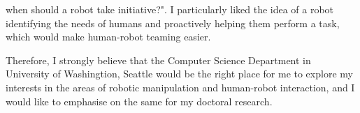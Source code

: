 \documentclass[11pt]{article}
\newcommand{\statement}[1]{\par\medskip
  \textcolor{blue}{\textbf{#1:}}\space
}
\begin{document}
when should a robot take initiative?". I particularly liked the idea of a robot identifying the needs of humans and proactively helping them perform a task, which would make human-robot teaming easier. 
\par
\justify
Therefore, I strongly believe that the Computer Science Department in University of Washingtion, Seattle would be the right place for me to explore my interests in the areas of robotic manipulation and human-robot interaction, and I would like to emphasise on the same for my doctoral research. 






%
%
\end{document}
